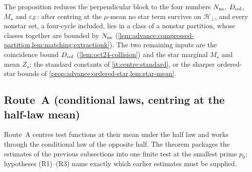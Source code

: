 The proposition reduces the perpendicular block to the four numbers $N_{\rm ns}$,
$D_{\rm col}$, $M_\star$ and $\varepsilon_Z$: after centring at
the $\mu$-mean no star term survives on $\mathcal H_\perp$, and every nonstar set, a
four-cycle included, lies in a class of a nonstar partition, whose classes together
are bounded by $N_{\rm ns}$
(\cref{lem:advance:compressed-partition,lem:matching:extractionk}). The two
remaining inputs are the coincidence bound $D_{\rm col}$ (\cref{lem:oct24-collision})
and the star marginal $M_\star$ and mean $Z_\star$: the standard constants of
\ref{it:centre:standard}, or the sharper ordered-star bounds of
\cref{prop:advance:ordered-star,lem:star-mean}.

\subsection{Route~A (conditional laws, centring at the half-law mean)}\label{subsec:spec:routeA}

Route~A centres test functions at their mean under the half law
and works through the conditional law of the opposite half. The
theorem packages the estimates of the previous subsections into
one finite test at the smallest prime $p_0$; hypotheses
(R1)--(R3) name exactly which earlier estimates must be supplied.

